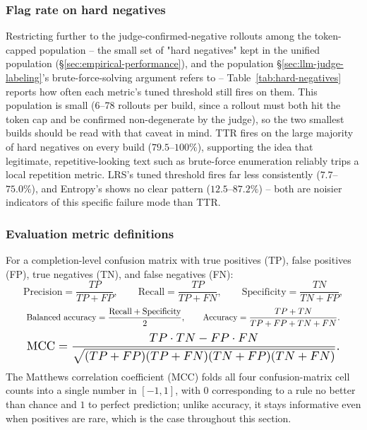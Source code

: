 \documentclass{article}
\begin{document}
\subsubsection{Flag rate on hard negatives}
\label{sec:hard-negatives}

Restricting further to the judge-confirmed-negative rollouts among the
token-capped population -- the small set of "hard negatives" kept in the
unified population (\S\ref{sec:empirical-performance}), and the population
\S\ref{sec:llm-judge-labeling}'s brute-force-solving argument refers to --
Table~\ref{tab:hard-negatives} reports how often each metric's tuned
threshold still fires on them. This population is small (6--78 rollouts
per build, since a rollout must both hit the token cap and be confirmed
non-degenerate by the judge), so the two smallest builds should be read
with that caveat in mind. TTR fires on the large majority of hard
negatives on every build ($79.5$--$100\%$), supporting the idea that
legitimate, repetitive-looking text such as brute-force enumeration
reliably trips a local repetition metric. LRS's tuned threshold fires far
less consistently ($7.7$--$75.0\%$), and Entropy's shows no clear pattern
($12.5$--$87.2\%$) -- both are noisier indicators of this specific failure
mode than TTR.

\begin{table}[h]
\centering
{}
\caption{Fraction of judge-confirmed-negative, token-capped rollouts
("hard negatives") each metric's own tuned threshold still flags as
positive.}
\label{tab:hard-negatives}
\end{table}

\subsubsection{Evaluation metric definitions}

For a completion-level confusion matrix with true positives (TP), false
positives (FP), true negatives (TN), and false negatives (FN):
\[
\text{Precision}=\frac{TP}{TP+FP},
\qquad
\text{Recall}=\frac{TP}{TP+FN},
\qquad
\text{Specificity}=\frac{TN}{TN+FP},
\]
\[
\resizebox{0.92\linewidth}{!}{$\text{Balanced accuracy}=\dfrac{\text{Recall}+\text{Specificity}}{2},
\qquad
\text{Accuracy}=\dfrac{TP+TN}{TP+FP+TN+FN}.$}
\]
\[
\resizebox{0.92\linewidth}{!}{$\text{MCC}=\dfrac{TP\cdot TN-FP\cdot FN}{\sqrt{(TP+FP)(TP+FN)(TN+FP)(TN+FN)}}.$}
\]
The Matthews correlation coefficient (MCC) folds all four confusion-matrix
cell counts into a single number in $[-1,1]$, with $0$ corresponding to a
rule no better than chance and $1$ to perfect prediction; unlike accuracy,
it stays informative even when positives are rare, which is the case
throughout this section.
\end{document}
